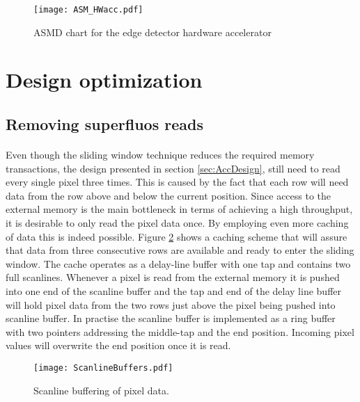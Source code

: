 \begin{figure}[H]
	\centering
	\texttt{[image: ASM\_HWacc.pdf]}
	\caption{ASMD chart for the edge detector hardware accelerator}
	\label{fig:ASM_HW}
\end{figure}

\section{Design optimization}
\label{sec:Optimization}
\subsection*{Removing superfluos reads}
\label{sec:memaccess}
\paragraph*{}
Even though the sliding window technique reduces the required memory transactions, the design presented in section \ref{sec:AccDesign}, still need to read every single pixel three times. This is caused by the fact that each row will need data from the row above and below the current position. Since access to the external memory is the main bottleneck in terms of achieving a high throughput, it is desirable to only read the pixel data once. By employing even more caching of data this is indeed possible. Figure \ref{fig:ScanlineBuffers} shows a caching scheme that will assure that data from three consecutive rows are available and ready to enter the sliding window. The cache operates as a delay-line buffer with one tap and contains two full scanlines. Whenever a pixel is read from the external memory it is pushed into one end of the scanline buffer and the tap and end of the delay line buffer will hold pixel data from the two rows just above the pixel being pushed into  scanline buffer. In practise the scanline buffer is implemented as a ring buffer with two pointers addressing the middle-tap and the end position. 
Incoming pixel values will overwrite the end position once it is read.

\begin{figure}[H]
	\centering
	\texttt{[image: ScanlineBuffers.pdf]}
	\caption{Scanline buffering of pixel data.}
	\label{fig:ScanlineBuffers}
\end{figure}

